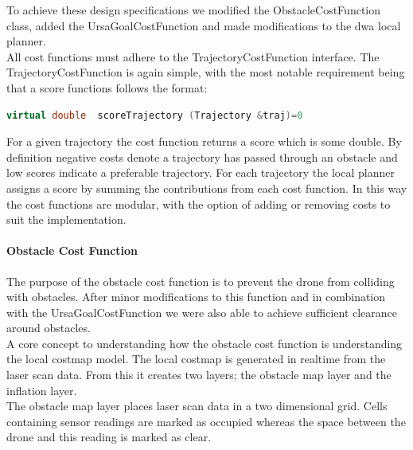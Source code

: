 \documentclass[capstone_report.tex]{subfiles}
\begin{document}
To achieve these design specifications we modified the ObstacleCostFunction class, added the UrsaGoalCostFunction and made modifications to the dwa local planner.\\

All cost functions must adhere to the TrajectoryCostFunction interface. The TrajectoryCostFunction is again simple, with the most notable requirement being that a score functions follows the format:

\begin{lstlisting}[language=c++]
    virtual double  scoreTrajectory (Trajectory &traj)=0
\end{lstlisting}

For a given trajectory the cost function returns a score which is some double.  By definition negative costs denote a trajectory has passed through an obstacle and low scores indicate a preferable trajectory.  For each trajectory the local planner assigns a score by summing the contributions from each cost function.   In this way the cost functions are modular, with the option of adding or removing costs to suit the implementation.  

\paragraph{Obstacle Cost Function}  
The purpose of the obstacle cost function is to prevent the drone from colliding with obstacles.  After minor modifications to this function and in combination with the UrsaGoalCostFunction we were also able to achieve sufficient clearance around obstacles. \\

A core concept to understanding how the obstacle cost function is understanding the local costmap model.  The local costmap is generated in realtime from the laser scan data.  From this it creates two layers; the obstacle map layer and the inflation layer. \\

The obstacle map layer places laser scan data in a two dimensional grid.  Cells containing sensor readings are marked as occupied whereas the space between the drone and this reading is marked as clear.\\
\end{document}
